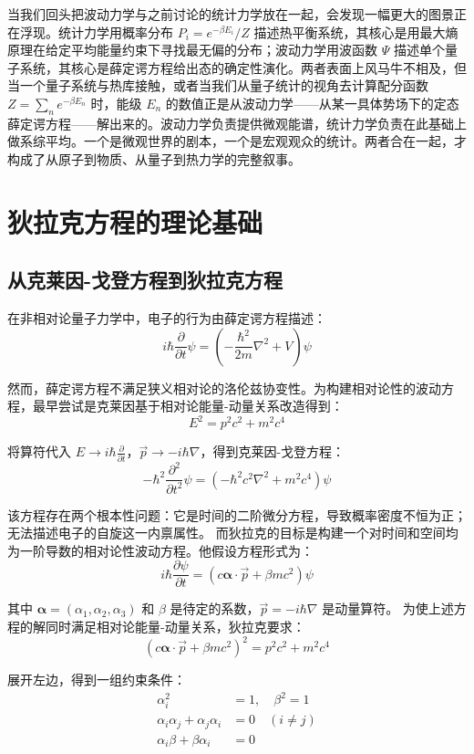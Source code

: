 \documentclass[UTF8]{ctexbook}
\begin{document}
当我们回头把波动力学与之前讨论的统计力学放在一起，会发现一幅更大的图景正在浮现。统计力学用概率分布 $P_i = e^{-\beta E_i}/Z$ 描述热平衡系统，其核心是用最大熵原理在给定平均能量约束下寻找最无偏的分布；波动力学用波函数 $\Psi$ 描述单个量子系统，其核心是薛定谔方程给出态的确定性演化。两者表面上风马牛不相及，但当一个量子系统与热库接触，或者当我们从量子统计的视角去计算配分函数 $Z = \sum_n e^{-\beta E_n}$ 时，能级 $E_n$ 的数值正是从波动力学——从某一具体势场下的定态薛定谔方程——解出来的。波动力学负责提供微观能谱，统计力学负责在此基础上做系综平均。一个是微观世界的剧本，一个是宏观观众的统计。两者合在一起，才构成了从原子到物质、从量子到热力学的完整叙事。



\newpage
\section{狄拉克方程的理论基础}

\subsection{从克莱因-戈登方程到狄拉克方程}

在非相对论量子力学中，电子的行为由薛定谔方程描述：
\[
i\hbar\frac{\partial}{\partial t}\psi = \left( -\frac{\hbar^2}{2m}\nabla^2 + V \right)\psi
\]

然而，薛定谔方程不满足狭义相对论的洛伦兹协变性。为构建相对论性的波动方程，最早尝试是克莱因基于相对论能量-动量关系改造得到：
\[
E^2 = p^2c^2 + m^2c^4
\]

将算符代入 \( E \rightarrow i\hbar\frac{\partial}{\partial t} \)，\( \vec{p} \rightarrow -i\hbar\nabla \)，得到克莱因-戈登方程：
\[
-\hbar^2\frac{\partial^2}{\partial t^2}\psi = \left( -\hbar^2c^2\nabla^2 + m^2c^4 \right)\psi
\]

该方程存在两个根本性问题：它是时间的二阶微分方程，导致概率密度不恒为正；无法描述电子的自旋这一内禀属性。
而狄拉克的目标是构建一个对时间和空间均为一阶导数的相对论性波动方程。他假设方程形式为：
\[
i\hbar\frac{\partial\psi}{\partial t} = \left( c\boldsymbol{\alpha}\cdot\vec{p} + \beta mc^2 \right)\psi
\]

其中 \(\boldsymbol{\alpha} = (\alpha_1, \alpha_2, \alpha_3)\) 和 \(\beta\) 是待定的系数，\(\vec{p} = -i\hbar\nabla\) 是动量算符。
为使上述方程的解同时满足相对论能量-动量关系，狄拉克要求：
\[
\left( c\boldsymbol{\alpha}\cdot\vec{p} + \beta mc^2 \right)^2 = p^2c^2 + m^2c^4
\]

展开左边，得到一组约束条件：
\begin{align*}
\alpha_i^2 &= 1, \quad \beta^2 = 1 \\
\alpha_i\alpha_j + \alpha_j\alpha_i &= 0 \quad (i \neq j) \\
\alpha_i\beta + \beta\alpha_i &= 0
\end{align*}
\end{document}
